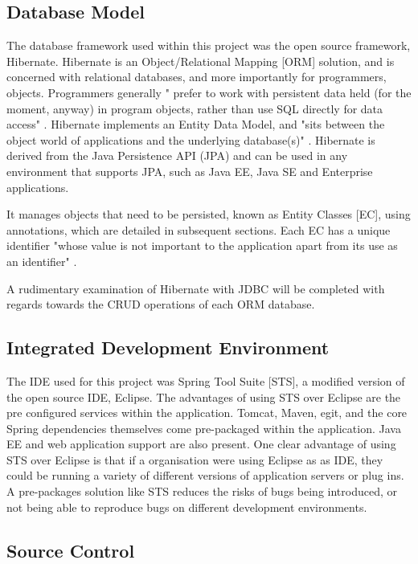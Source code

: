 \subsection{Database Model}

The database framework used within this project was the open source framework, Hibernate. Hibernate is an Object/Relational Mapping [ORM] solution, and is concerned with relational databases, and more importantly for programmers, objects. Programmers generally " prefer to work with persistent data held (for the moment, anyway) in program objects, rather than use SQL directly for data access" \parencite{bauer2005hibernate}. Hibernate implements an Entity Data Model, and "sits between the object world of applications and the underlying database(s)" \parencite{bauer2005hibernate}. Hibernate is derived from the Java Persistence API (JPA) and can be used in any environment that supports JPA, such as Java EE, Java SE and Enterprise applications.

It manages objects that need to be persisted, known as Entity Classes [EC], using annotations, which are detailed in subsequent sections. Each EC has a unique identifier "whose value is not important to the application apart from its use as an identifier" \parencite{bauer2005hibernate}. 

A rudimentary examination of Hibernate with JDBC will be completed with regards towards the CRUD operations of each ORM database.

\subsection{Integrated Development Environment}

The IDE used for this project was Spring Tool Suite [STS], a modified version of the open source IDE, Eclipse. The advantages of using STS over Eclipse are the pre configured services within the application. Tomcat, Maven, egit, and the core Spring dependencies themselves come pre-packaged within the application. Java EE and web application support are also present. One clear advantage of using STS over Eclipse is that if a organisation were using Eclipse as as IDE, they could be running a variety of different versions of application servers or plug ins. A pre-packages solution like STS reduces the risks of bugs being introduced, or not being able to reproduce bugs on different development environments.

\subsection{Source Control}

